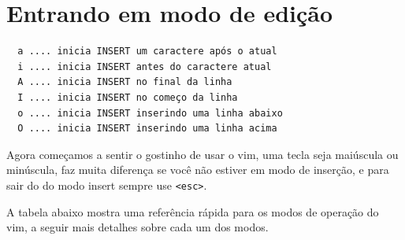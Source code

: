 \documentclass[10pt,a4paper,openany]{book}
\begin{document}
\section{Entrando em modo de edição}
\label{Entrando em modo de edição}

\begin{verbatim}
  a .... inicia INSERT um caractere após o atual
  i .... inicia INSERT antes do caractere atual
  A .... inicia INSERT no final da linha
  I .... inicia INSERT no começo da linha
  o .... inicia INSERT inserindo uma linha abaixo
  O .... inicia INSERT inserindo uma linha acima
\end{verbatim}

Agora começamos a sentir o gostinho de usar o vim, uma tecla seja
maiúscula ou minúscula, faz muita diferença se você não estiver em
modo de inserção, e para sair do do modo insert sempre use \verb|<esc>|.

A tabela abaixo mostra uma referência rápida para os modos de operação do vim,
a seguir mais detalhes sobre cada um dos modos.
\end{document}
